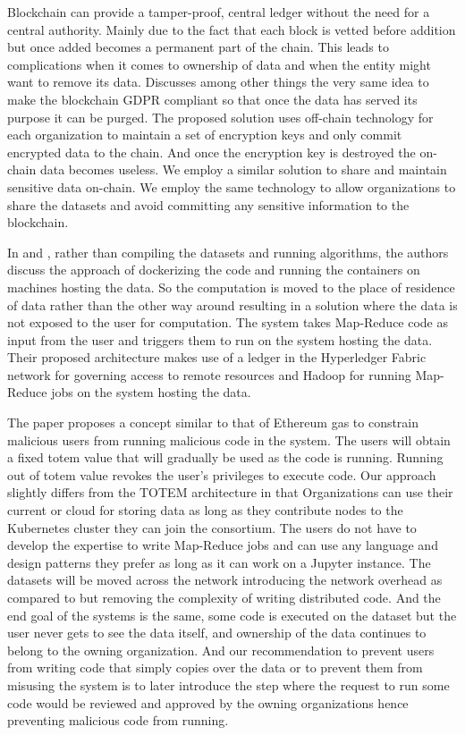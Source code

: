 \bigskip
Blockchain can provide a tamper-proof, central ledger without the need for a central authority. Mainly due to the fact that each block is vetted before addition but once added becomes a permanent part of the chain. This leads to complications when it comes to ownership of data and when the entity might want to remove its data. \cite{gdpr-compliant} Discusses among other things the very same idea to make the blockchain GDPR compliant so that once the data has served its purpose it can be purged. The proposed solution uses off-chain technology for each organization to maintain a set of encryption keys and only commit encrypted data to the chain. And once the encryption key is destroyed the on-chain data becomes useless. We employ a similar solution to share and maintain sensitive data on-chain. We employ the same technology to allow organizations to share the datasets and avoid committing any sensitive information to the blockchain.

\bigskip
In \cite{totem} and \cite{secure-computed-blockchain}, rather than compiling the datasets and running algorithms, the authors discuss the approach of dockerizing the code and running the containers on machines hosting the data. So the computation is moved to the place of residence of data rather than the other way around resulting in a solution where the data is not exposed to the user for computation. The system takes Map-Reduce code as input from the user and triggers them to run on the system hosting the data. Their proposed architecture makes use of a ledger in the Hyperledger Fabric network for governing access to remote resources and Hadoop for running Map-Reduce jobs on the system hosting the data.

\bigskip
The paper proposes a concept similar to that of Ethereum gas to constrain malicious users from running malicious code in the system. The users will obtain a fixed totem value that will gradually be used as the code is running. Running out of totem value revokes the user's privileges to execute code. Our approach slightly differs from the TOTEM architecture in that Organizations can use their current or cloud for storing data as long as they contribute nodes to the Kubernetes cluster they can join the consortium. The users do not have to develop the expertise to write Map-Reduce jobs and can use any language and design patterns they prefer as long as it can work on a Jupyter instance. The datasets will be moved across the network introducing the network overhead as compared to \cite{secure-computed-blockchain} but removing the complexity of writing distributed code. And the end goal of the systems is the same, some code is executed on the dataset but the user never gets to see the data itself, and ownership of the data continues to belong to the owning organization. And our recommendation to prevent users from writing code that simply copies over the data or to prevent them from misusing the system is to later introduce the step where the request to run some code would be reviewed and approved by the owning organizations hence preventing malicious code from running.

